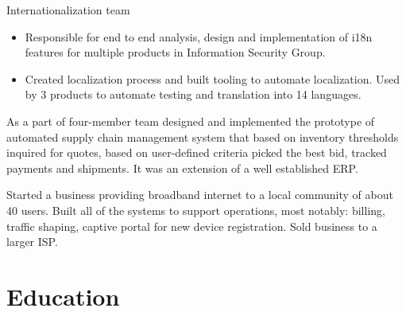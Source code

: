 \documentclass[11pt,a4paper,roman]{moderncv}       %
\begin{document}
Internationalization team

\begin{itemize}
    \item Responsible for end to end analysis, design and implementation of i18n features for multiple products in Information Security Group.
    \item Created localization process and built tooling to automate localization. Used by 3 products to automate testing and translation into 14 languages.
\end{itemize}

\bigskip


As a part of four-member team designed and implemented the prototype of automated supply chain management system that based on inventory thresholds inquired for quotes, based on user-defined criteria picked the best bid, tracked payments and shipments. It was an extension of a well established ERP.

\bigskip


Started a business providing broadband internet to a local community of about 40 users. Built all of the systems to support operations, most notably: billing, traffic shaping, captive portal for new device registration. Sold business to a larger ISP.

\pagebreak
\section{Education}





\end{document}
